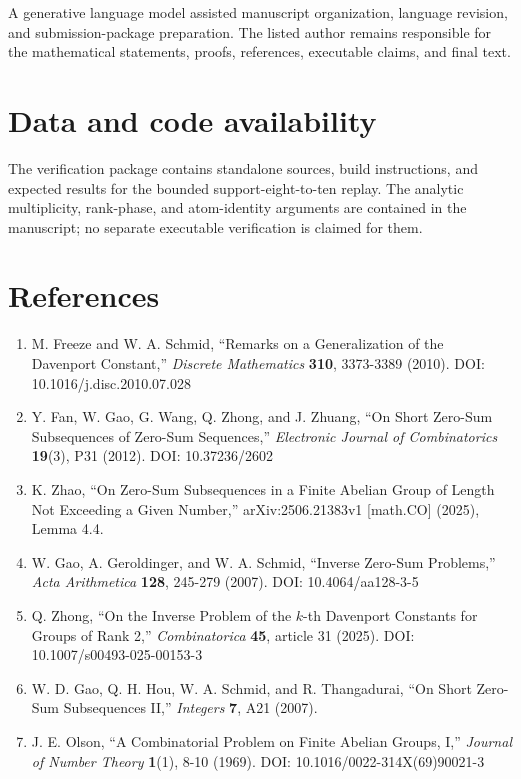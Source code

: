 \documentclass[
  11pt,
]{article}
\providecommand{\tightlist}{%
  \setlength{\itemsep}{0pt}\setlength{\parskip}{0pt}}
\begin{document}
A generative language model assisted manuscript organization, language
revision, and submission-package preparation. The listed author remains
responsible for the mathematical statements, proofs, references,
executable claims, and final text.

\hypertarget{data-and-code-availability}{%
\section{Data and code availability}\label{data-and-code-availability}}

The verification package contains standalone sources, build
instructions, and expected results for the bounded support-eight-to-ten
replay. The analytic multiplicity, rank-phase, and atom-identity
arguments are contained in the manuscript; no separate executable
verification is claimed for them.

\hypertarget{references}{%
\section{References}\label{references}}

\begin{enumerate}
\def\labelenumi{\arabic{enumi}.}
\tightlist
\item
  M. Freeze and W. A. Schmid, ``Remarks on a Generalization of the
  Davenport Constant,'' \emph{Discrete Mathematics} \textbf{310},
  3373-3389 (2010). DOI: 10.1016/j.disc.2010.07.028
\item
  Y. Fan, W. Gao, G. Wang, Q. Zhong, and J. Zhuang, ``On Short Zero-Sum
  Subsequences of Zero-Sum Sequences,'' \emph{Electronic Journal of
  Combinatorics} \textbf{19}(3), P31 (2012). DOI: 10.37236/2602
\item
  K. Zhao, ``On Zero-Sum Subsequences in a Finite Abelian Group of
  Length Not Exceeding a Given Number,'' arXiv:2506.21383v1
  {[}math.CO{]} (2025), Lemma 4.4.
\item
  W. Gao, A. Geroldinger, and W. A. Schmid, ``Inverse Zero-Sum
  Problems,'' \emph{Acta Arithmetica} \textbf{128}, 245-279 (2007). DOI:
  10.4064/aa128-3-5
\item
  Q. Zhong, ``On the Inverse Problem of the \(k\)-th Davenport Constants
  for Groups of Rank 2,'' \emph{Combinatorica} \textbf{45}, article 31
  (2025). DOI: 10.1007/s00493-025-00153-3
\item
  W. D. Gao, Q. H. Hou, W. A. Schmid, and R. Thangadurai, ``On Short
  Zero-Sum Subsequences II,'' \emph{Integers} \textbf{7}, A21 (2007).
\item
  J. E. Olson, ``A Combinatorial Problem on Finite Abelian Groups, I,''
  \emph{Journal of Number Theory} \textbf{1}(1), 8-10 (1969). DOI:
  10.1016/0022-314X(69)90021-3
\end{enumerate}
\end{document}

